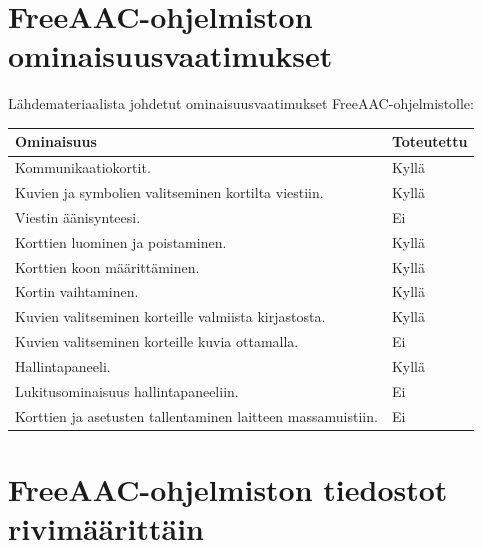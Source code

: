 \documentclass[utf8]{gradu3}
\begin{document}
\appendix

\section{FreeAAC-ohjelmiston ominaisuusvaatimukset}

Lähdemateriaalista johdetut ominaisuusvaatimukset FreeAAC-ohjelmistolle:

\begin{center}
    \begin{tabular}{ | l | l |}
    \hline
    \textbf{Ominaisuus} & \textbf{Toteutettu} \\ \hline
    Kommunikaatiokortit. & Kyllä \\ \hline
    Kuvien ja symbolien valitseminen kortilta viestiin. & Kyllä \\ \hline
    Viestin äänisynteesi. & Ei \\ \hline
    Korttien luominen ja poistaminen. & Kyllä \\ \hline
    Korttien koon määrittäminen. & Kyllä \\ \hline
    Kortin vaihtaminen. & Kyllä \\ \hline
    Kuvien valitseminen korteille valmiista kirjastosta. & Kyllä \\ \hline
    Kuvien valitseminen korteille kuvia ottamalla. & Ei \\ \hline
    Hallintapaneeli. & Kyllä \\ \hline
    Lukitusominaisuus hallintapaneeliin. & Ei \\ \hline
    Korttien ja asetusten tallentaminen laitteen massamuistiin. & Ei \\ \hline
    \end{tabular}
\end{center}

\section{FreeAAC-ohjelmiston tiedostot rivimäärittäin}
\end{document}
